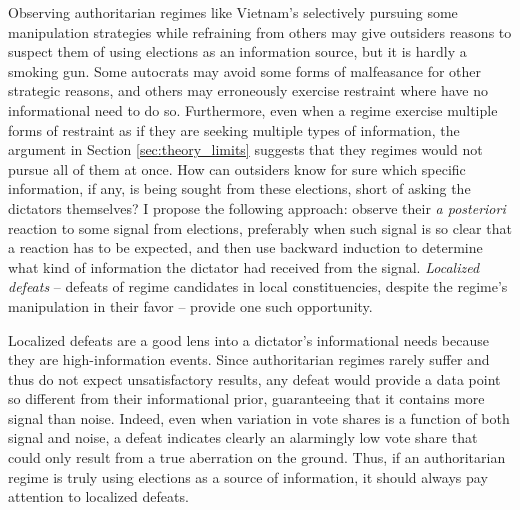 \documentclass[12pt]{article}
\newcommand{\1}{\mathbbm{1}}
\begin{document}
Observing authoritarian regimes like Vietnam’s selectively pursuing some manipulation strategies while refraining from others may give outsiders reasons to suspect them of using elections as an information source, but it is hardly a smoking gun. Some autocrats may avoid some forms of malfeasance for other strategic reasons, and others may erroneously exercise restraint where have no informational need to do so. Furthermore, even when a regime exercise multiple forms of restraint as if they are seeking multiple types of information, the argument in Section \ref{sec:theory_limits} suggests that they regimes would not pursue all of them at once. How can outsiders know for sure which specific information, if any, is being sought from these elections, short of asking the dictators themselves?   I propose the following approach: observe their \textit{a posteriori} reaction to some signal from elections, preferably when such signal is so clear that a reaction has to be expected, and then use backward induction to determine what kind of information the dictator had received from the signal. \textit{Localized defeats} -- defeats of regime candidates in local constituencies, despite the regime's manipulation in their favor -- provide one such opportunity.


Localized defeats are a good lens into a dictator's informational needs because they are high-information events. Since authoritarian regimes rarely suffer and thus do not expect unsatisfactory results, any defeat would provide a data point so different from their informational prior, guaranteeing that it contains more signal than noise. Indeed, even when variation in vote shares is a function of both signal and noise, a defeat indicates clearly an alarmingly low vote share that could only result from a true aberration on the ground. Thus, if an authoritarian regime is truly using elections as a source of information, it should always pay attention to localized defeats. 
\end{document}
